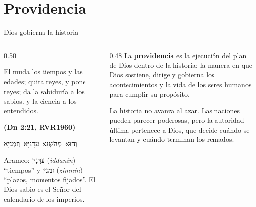 \documentclass[hyperref={bookmarks=false},aspectratio=169]{beamer}
\newcommand{\heb}[1]{\mbox{\foreignlanguage{hebrew}{#1}}}
\newcommand{\fuente}[1]{\par\hfill{\upshape\bfseries\footnotesize\textcolor{azul}{#1}}}
\newcommand{\destacar}[1]{\textbf{\textcolor{azul}{#1}}}
\begin{document}
\section{Providencia}

\begin{frame}{Dios gobierna la historia}
\begin{columns}[t,onlytextwidth]
\begin{column}{0.50\textwidth}
\begin{cita}El muda los tiempos y las edades; quita reyes, y pone reyes; da la sabiduría a los sabios, y la ciencia a los entendidos.\fuente{(Dn 2:21, RVR1960)}\end{cita}
\begin{center}\heb{וְהוּא מְהַשְׁנֵא עִדָּנַיָּא וְזִמְנַיָּא}\end{center}
\scriptsize Arameo: \heb{עִדָּנִין} (\emph{iddanín}) ``tiempos'' y \heb{זִמְנִין} (\emph{zimnín}) ``plazos, momentos fijados''. El Dios sabio es el Señor del calendario de los imperios.
\end{column}
\begin{column}{0.48\textwidth}\small
La \destacar{providencia} es la ejecución del plan de Dios dentro de la historia: la manera en que Dios sostiene, dirige y gobierna los acontecimientos y la vida de los seres humanos para cumplir su propósito.\par\medskip
La historia no avanza al azar. Las naciones pueden parecer poderosas, pero la autoridad última pertenece a Dios, que decide cuándo se levantan y cuándo terminan los reinados.
\end{column}
\end{columns}
\end{frame}
\end{document}
